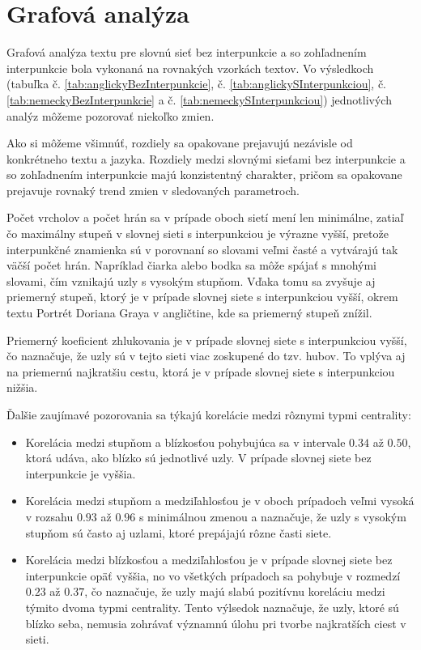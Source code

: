 \clearpage

\section{Grafová analýza}\label{sec:grafovaAnalyza}

Grafová analýza textu pre slovnú sieť bez interpunkcie a so zohľadnením interpunkcie bola vykonaná na rovnakých vzorkách textov.
Vo výsledkoch (tabuľka č. \ref{tab:anglickyBezInterpunkcie}, č. \ref{tab:anglickySInterpunkciou}, č. \ref{tab:nemeckyBezInterpunkcie} a č. \ref{tab:nemeckySInterpunkciou})
jednotlivých analýz môžeme pozorovať niekoľko zmien.

Ako si môžeme všimnúť, rozdiely sa opakovane prejavujú nezávisle od konkrétneho textu a jazyka. Rozdiely medzi slovnými sieťami bez interpunkcie a so zohľadnením interpunkcie
majú konzistentný charakter, pričom sa opakovane prejavuje rovnaký trend zmien v sledovaných parametroch.

Počet vrcholov a počet hrán sa v prípade oboch sietí mení len minimálne, zatiaľ čo maximálny stupeň v slovnej sieti s interpunkciou je výrazne vyšší, pretože
interpunkčné znamienka sú v porovnaní so slovami veľmi časté a vytvárajú tak väčší počet hrán. Napríklad čiarka alebo bodka sa môže spájať s mnohými slovami, čím vznikajú
uzly s vysokým stupňom. Vďaka tomu sa zvyšuje aj priemerný stupeň, ktorý je v prípade slovnej siete s interpunkciou vyšší, okrem textu Portrét Doriana Graya v angličtine, kde sa
priemerný stupeň znížil. 

Priemerný koeficient zhlukovania je v prípade slovnej siete s interpunkciou vyšší, čo naznačuje, že uzly sú v tejto sieti viac zoskupené do tzv. hubov. To vplýva aj na 
priemernú najkratšiu cestu, ktorá je v prípade slovnej siete s interpunkciou nižšia.

Ďalšie zaujímavé pozorovania sa týkajú korelácie medzi rôznymi typmi centrality:
\begin{itemize}
    \item Korelácia medzi stupňom a blízkosťou pohybujúca sa v intervale $0.34$ až $0.50$, ktorá udáva, ako blízko sú jednotlivé uzly.
          V prípade slovnej siete bez interpunkcie je vyššia.
    \item Korelácia medzi stupňom a medziľahlosťou je v oboch prípadoch veľmi vysoká v rozsahu $0.93$ až $0.96$ s minimálnou zmenou a naznačuje, že uzly s vysokým stupňom
          sú často aj uzlami, ktoré prepájajú rôzne časti siete.
    \item Korelácia medzi blízkosťou a medziľahlosťou je v prípade slovnej siete bez interpunkcie opäť vyššia, no vo všetkých prípadoch sa
          pohybuje v rozmedzí $0.23$ až $0.37$, čo naznačuje, že uzly majú slabú pozitívnu koreláciu medzi týmito dvoma typmi centrality. Tento výlsedok naznačuje, že uzly, ktoré sú blízko seba,
          nemusia zohrávať významnú úlohu pri tvorbe najkratších ciest v sieti.
\end{itemize}


